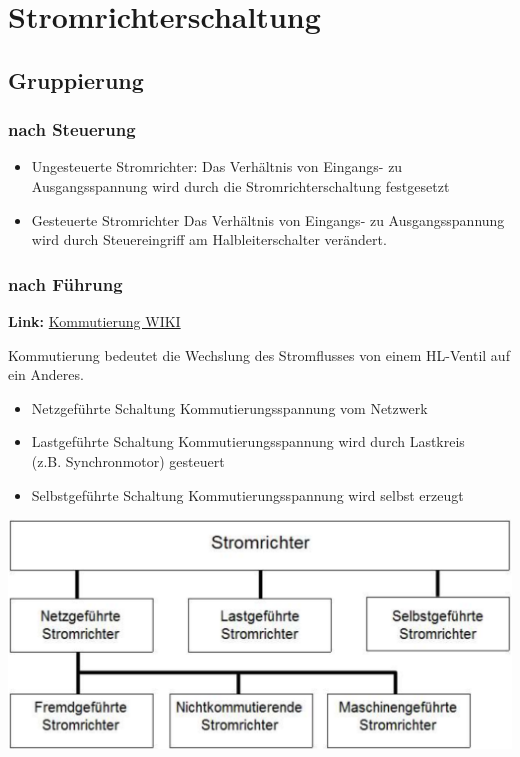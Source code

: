 \section{Stromrichterschaltung}
\subsection{Gruppierung}
\subsubsection{nach Steuerung}
\begin{itemize}
    \item Ungesteuerte Stromrichter:
        \subitem Das Verhältnis von Eingangs- zu Ausgangsspannung wird durch die Stromrichterschaltung festgesetzt
    \item Gesteuerte Stromrichter
        \subitem Das Verhältnis von Eingangs- zu Ausgangsspannung wird durch Steuereingriff am Halbleiterschalter verändert. 
\end{itemize}

\subsubsection{nach Führung}
\textbf{Link:} \href{https://de.wikipedia.org/wiki/Kommutierung}{Kommutierung WIKI}\\[0.2cm]
\begin{minipage}{0.6\linewidth}
Kommutierung bedeutet die Wechslung des Stromflusses von einem HL-Ventil auf ein Anderes.
\begin{itemize}
    \item Netzgeführte Schaltung
        \subitem Kommutierungsspannung vom Netzwerk
    \item Lastgeführte Schaltung
        \subitem Kommutierungsspannung wird durch Lastkreis\\
        (z.B. Synchronmotor) gesteuert
    \item Selbstgeführte Schaltung
        \subitem Kommutierungsspannung wird selbst erzeugt
\end{itemize}
\end{minipage}
\begin{minipage}{0.4\linewidth}
    \includegraphics[width=\linewidth]{images/StromrichterKennzeichnung}\newline
\end{minipage}

